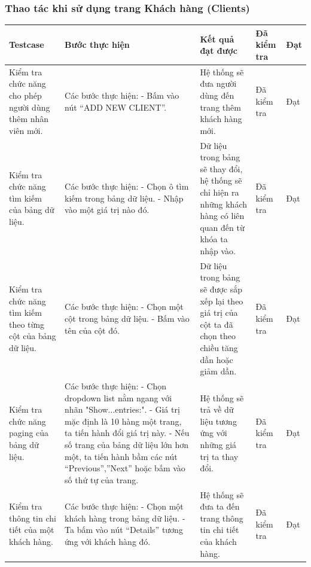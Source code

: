 \documentclass[a4paper]{article}
\begin{document}
\subsubsection*{Thao tác khi sử dụng trang Khách hàng (Clients)  }
\begin{longtable}{ | p{} |p{} | p{}  | p{}  | p{}  | } 
\hline
\textbf{Testcase}& \textbf{Bước thực hiện}& \textbf{Kết quả đạt được} & \textbf{Đã kiểm tra}& \textbf{Đạt} \\ 
\hline
\hline
Kiểm tra chức năng cho phép người dùng thêm nhân viên mới. &
Các bước thực hiện: \newline
- Bấm vào nút “ADD NEW CLIENT”.
&
Hệ thống sẽ đưa người dùng đến trang thêm khách hàng mới. &
Đã kiểm tra &
Đạt \\

\hline
Kiểm tra chức năng tìm kiếm của bảng dữ liệu. &
Các bước thực hiện: \newline
- Chọn ô tìm kiếm trong bảng dữ liệu. \newline
- Nhập vào một giá trị nào đó.
&
Dữ liệu trong bảng sẽ thay đổi, hệ thống sẽ chỉ hiện ra những khách hàng có liên quan đến từ khóa ta nhập vào. &
Đã kiểm tra &
Đạt \\

\hline
Kiểm tra chức năng tìm kiếm theo từng cột của bảng dữ liệu. &
Các bước thực hiện: \newline
- Chọn một cột trong bảng dữ liệu. \newline
- Bấm vào tên của cột đó. 
&
Dữ liệu trong bảng sẽ được sắp xếp lại theo giá trị của cột ta đã chọn theo chiều tăng dần hoặc giảm dần. &
Đã kiểm tra &
Đạt \\

\hline
Kiểm tra chức năng paging của bảng dữ liệu. &
Các bước thực hiện: \newline
- Chọn dropdown list nằm ngang với nhãn "Show...entries:". \newline
- Giá trị mặc định là 10 hàng một trang, ta tiến hành đổi giá trị này. \newline
- Nếu số trang của bảng dữ liệu lớn hơn một, ta tiến hành bầm các nút “Previous”,”Next” hoặc bấm vào số thứ tự của trang.
&
Hệ thống sẽ trả về dữ liệu tương ứng với những giá trị ta thay đổi. &
Đã kiểm tra &
Đạt \\

\hline
Kiểm tra thông tin chi tiết của một khách hàng. &
Các bước thực hiện: \newline
- Chọn một khách hàng trong bảng dữ liệu. \newline
- Ta bấm vào nút “Details” tương ứng với khách hàng đó. 
&
Hệ thống sẽ đưa ta đến trang thông tin chi tiết của khách hàng. &
Đã kiểm tra &
Đạt \\


\end{longtable}
\end{document}
